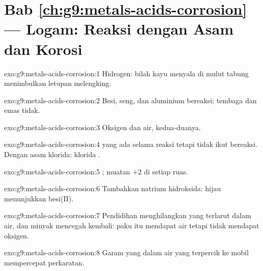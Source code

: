 \section*{Bab \ref{ch:g9:metals-acids-corrosion} --- Logam: Reaksi dengan Asam dan Korosi}

\begin{solution}{exo:g9:metals-acids-corrosion:1}
Hidrogen: bilah kayu menyala di mulut tabung menimbulkan letupan
melengking.
\end{solution}

\begin{solution}{exo:g9:metals-acids-corrosion:2}
Besi, seng, dan aluminium bereaksi; tembaga dan emas tidak.
\end{solution}

\begin{solution}{exo:g9:metals-acids-corrosion:3}
Oksigen dan air, kedua-duanya.
\end{solution}

\begin{solution}{exo:g9:metals-acids-corrosion:4}
 yang ada selama reaksi tetapi tidak ikut bereaksi. Dengan asam
klorida:  klorida .
\end{solution}

\begin{solution}{exo:g9:metals-acids-corrosion:5}
; muatan $+2$ di setiap ruas.
\end{solution}

\begin{solution}{exo:g9:metals-acids-corrosion:6}
Tambahkan natrium hidroksida:  hijau  menunjukkan
 besi(II).
\end{solution}

\begin{solution}{exo:g9:metals-acids-corrosion:7}
Pendidihan menghilangkan  yang terlarut dalam air, dan minyak
mencegah   kembali: paku itu mendapat air tetapi tidak
mendapat oksigen.
\end{solution}

\begin{solution}{exo:g9:metals-acids-corrosion:8}
Garam yang  dalam air yang terpercik ke mobil mempercepat
perkaratan.
\end{solution}

